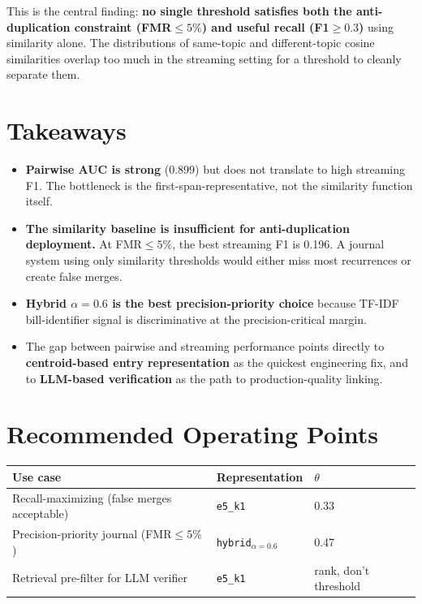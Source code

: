 \documentclass[11pt,a4paper]{article}
\begin{document}
\noindent This is the central finding: \textbf{no single threshold satisfies both the
anti-duplication constraint (FMR$\le5\%$) and useful recall (F1$\ge0.3$)} using similarity
alone.  The distributions of same-topic and different-topic cosine similarities overlap too
much in the streaming setting for a threshold to cleanly separate them.

\section{Takeaways}

\begin{itemize}[noitemsep]
  \item \textbf{Pairwise AUC is strong} (0.899) but does not translate to high streaming F1.
        The bottleneck is the first-span-representative, not the similarity function itself.
  \item \textbf{The similarity baseline is insufficient for anti-duplication deployment.}
        At FMR$\le5\%$, the best streaming F1 is 0.196.  A journal system using only
        similarity thresholds would either miss most recurrences or create false merges.
  \item \textbf{Hybrid $\alpha=0.6$ is the best precision-priority choice} because TF-IDF
        bill-identifier signal is discriminative at the precision-critical margin.
  \item The gap between pairwise and streaming performance points directly to
        \textbf{centroid-based entry representation} as the quickest engineering fix,
        and to \textbf{LLM-based verification} as the path to production-quality linking.
\end{itemize}

\section{Recommended Operating Points}

\begin{center}
\begin{tabular}{lll}
\toprule
\textbf{Use case} & \textbf{Representation} & \textbf{$\theta$} \\
\midrule
Recall-maximizing (false merges acceptable) & \texttt{e5\_k1} & 0.33 \\
Precision-priority journal (FMR$\le5\%$) & \texttt{hybrid}$_{\alpha=0.6}$ & 0.47 \\
Retrieval pre-filter for LLM verifier & \texttt{e5\_k1} & rank, don't threshold \\
\bottomrule
\end{tabular}
\end{center}
\end{document}
